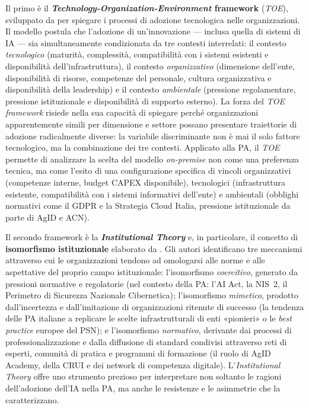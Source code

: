 Il primo è il \textbf{\textit{Technology-Organization-Environment} framework} (\textit{TOE}), sviluppato da \textcite{TornatzkyFleischer1990} per spiegare i processi di adozione tecnologica nelle organizzazioni. Il modello postula che l'adozione di un'innovazione — inclusa quella di sistemi di IA — sia simultaneamente condizionata da tre contesti interrelati: il contesto \textit{tecnologico} (maturità, complessità, compatibilità con i sistemi esistenti e disponibilità dell'infrastruttura), il contesto \textit{organizzativo} (dimensione dell'ente, disponibilità di risorse, competenze del personale, cultura organizzativa e disponibilità della leadership) e il contesto \textit{ambientale} (pressione regolamentare, pressione istituzionale e disponibilità di supporto esterno). La forza del \textit{TOE framework} risiede nella sua capacità di spiegare perché organizzazioni apparentemente simili per dimensione e settore possano presentare traiettorie di adozione radicalmente diverse: la variabile discriminante non è mai il solo fattore tecnologico, ma la combinazione dei tre contesti. Applicato alla PA, il \textit{TOE} permette di analizzare la scelta del modello \textit{on-premise} non come una preferenza tecnica, ma come l'esito di una configurazione specifica di vincoli organizzativi (competenze interne, budget CAPEX disponibile), tecnologici (infrastruttura esistente, compatibilità con i sistemi informativi dell'ente) e ambientali (obblighi normativi come il GDPR e la Strategia Cloud Italia, pressione istituzionale da parte di AgID e ACN).

Il secondo framework è la \textbf{\textit{Institutional Theory}} e, in particolare, il concetto di \textbf{isomorfismo istituzionale} elaborato da \textcite{DiMaggioPow1983}. Gli autori identificano tre meccanismi attraverso cui le organizzazioni tendono ad omologarsi alle norme e alle aspettative del proprio campo istituzionale: l'isomorfismo \textit{coercitivo}, generato da pressioni normative e regolatorie (nel contesto della PA: l'AI Act, la NIS~2, il Perimetro di Sicurezza Nazionale Cibernetica); l'isomorfismo \textit{mimetico}, prodotto dall'incertezza e dall'imitazione di organizzazioni ritenute di successo (la tendenza delle PA italiane a replicare le scelte infrastrutturali di enti «pionieri» o le \textit{best practice} europee del PSN); e l'isomorfismo \textit{normativo}, derivante dai processi di professionalizzazione e dalla diffusione di standard condivisi attraverso reti di esperti, comunità di pratica e programmi di formazione (il ruolo di AgID Academy, della CRUI e dei network di competenza digitale). L'\textit{Institutional Theory} offre uno strumento prezioso per interpretare non soltanto le ragioni dell'adozione dell'IA nella PA, ma anche le resistenze e le asimmetrie che la caratterizzano.

